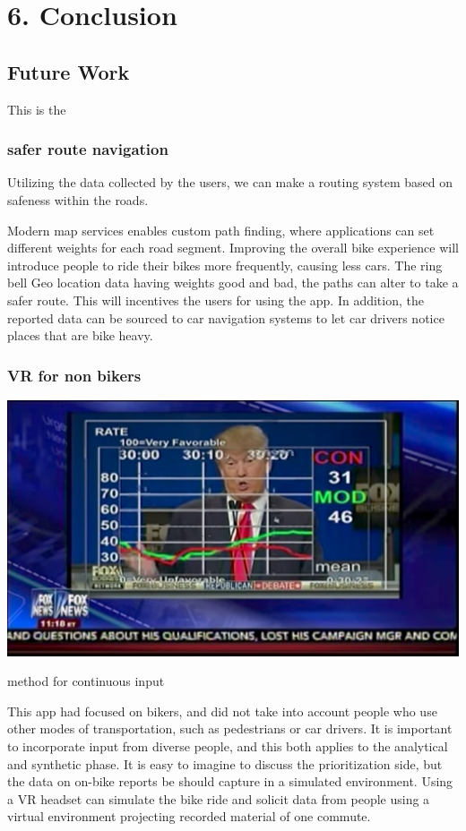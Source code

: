 \chapter{6. Conclusion}

\section{Future Work}

This is the 



\subsection{safer route navigation}
Utilizing the data collected by the users, we can make a routing system based on safeness within the roads.

Modern map services enables custom path finding, where applications can set different weights for each road segment. Improving the overall bike experience will introduce people to ride their bikes more frequently, causing less cars.
The ring bell Geo location data having weights good and bad, the paths can alter to take a safer route. This will incentives the users for using the app.
In addition, the reported data can be sourced to car navigation systems to let car drivers notice places that are bike heavy.



\subsection{VR for non bikers}

\begin{marginfigure}[{2cm}]
 	\includegraphics[width=\textwidth]{chapters/6/fig/pollester.png}               
 	 \caption{method for continuous input}
  	\label{fig:poll}
\end{marginfigure}
This app had focused on bikers, and did not take into account people who use other modes of transportation, such as pedestrians or car drivers. It is important to incorporate input from diverse people, and this both applies to the analytical and synthetic phase. It is easy to imagine to discuss the prioritization side, but the data on on-bike reports be should capture in a simulated environment.
Using a VR headset can simulate the bike ride and solicit data from people using a virtual environment projecting recorded material of one commute.

